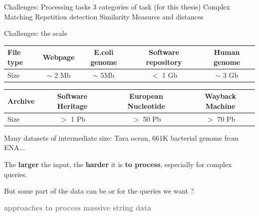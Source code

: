 
\begin{frame}{Challenges: Processing tasks}
3 categories of task (for this thesis)
Complex Matching
Repetition detection
Similarity Measures and distances
\end{frame}

\begin{frame}{Challenges: the scale}
    \begin{center}
        \begin{tabular}{l c c c c}
            File type & Webpage &  E.coli genome & Software repository & Human genome\\ \hline
            Size & $\sim$ 2 Mb & $\sim$ 5Mb &  $<$ 1 Gb & $\sim$ 3 Gb 
        \end{tabular}\pause

        \bigskip

        \begin{tabular}{l c c c}
            Archive & Software Heritage & European Nucleotide & Wayback Machine  \\ \hline
            Size & $>$ 1 Pb & $>$ 50 Pb &  $>$ 70 Pb
        \end{tabular}
    \end{center}\pause

    \bigskip
    Many datasets of intermediate size: Tara ocean, 661K bacterial genome from ENA...\pause

    \bigskip

    The \textbf{larger} the input, the \textbf{harder} it is \textbf{to process}, especially for complex queries.\pause

    \bigskip

    But some part of the data can be  or  for the queries we want ?\pause

\end{frame}


\begin{frame}
    \vfill
    \bigskip
    \begin{center}
        \textbf{\textcolor{gray}{ approaches to process massive string data}}
    \end{center}
    \vfill
\end{frame}

